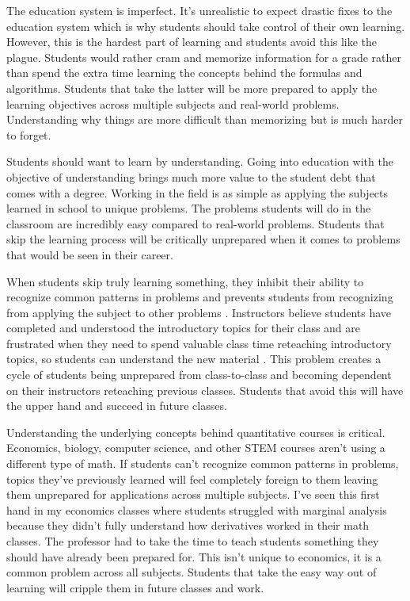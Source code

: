 \documentclass[11pt,]{article}
\begin{document}
The education system is imperfect. It's unrealistic to expect drastic
fixes to the education system which is why students should take control
of their own learning. However, this is the hardest part of learning and
students avoid this like the plague. Students would rather cram and
memorize information for a grade rather than spend the extra time
learning the concepts behind the formulas and algorithms. Students that
take the latter will be more prepared to apply the learning objectives
across multiple subjects and real-world problems. Understanding why
things are more difficult than memorizing but is much harder to forget.

Students should want to learn by understanding. Going into education
with the objective of understanding brings much more value to the
student debt that comes with a degree. Working in the field is as simple
as applying the subjects learned in school to unique problems. The
problems students will do in the classroom are incredibly easy compared
to real-world problems. Students that skip the learning process will be
critically unprepared when it comes to problems that would be seen in
their career.

When students skip truly learning something, they inhibit their ability
to recognize common patterns in problems and prevents students from
recognizing from applying the subject to other problems
\citet{bottge1999}. Instructors believe students have completed and
understood the introductory topics for their class and are frustrated
when they need to spend valuable class time reteaching introductory
topics, so students can understand the new material \citet{kennedy1998}.
This problem creates a cycle of students being unprepared from
class-to-class and becoming dependent on their instructors reteaching
previous classes. Students that avoid this will have the upper hand and
succeed in future classes.

Understanding the underlying concepts behind quantitative courses is
critical. Economics, biology, computer science, and other STEM courses
aren't using a different type of math. If students can't recognize
common patterns in problems, topics they've previously learned will feel
completely foreign to them leaving them unprepared for applications
across multiple subjects. I've seen this first hand in my economics
classes where students struggled with marginal analysis because they
didn't fully understand how derivatives worked in their math classes.
The professor had to take the time to teach students something they
should have already been prepared for. This isn't unique to economics,
it is a common problem across all subjects. Students that take the easy
way out of learning will cripple them in future classes and work.
\end{document}
